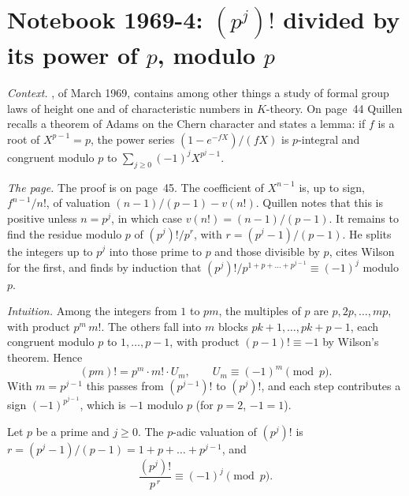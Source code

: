 \section[Notebook 1969-4: $(p^j)!$ divided by its power of $p$]{Notebook 1969-4: $(p^j)!$ divided by its power of $p$, modulo $p$\protect{}}\label{sec:quillen-1969-4}

\emph{Context.} , of March 1969, contains among other things a study of formal group laws of height one and of characteristic numbers in $K$-theory. On page~44 Quillen recalls a theorem of Adams on the Chern character and states a lemma: if $f$ is a root of $X^{p-1} = p$, the power series $(1 - e^{-fX})/(fX)$ is $p$-integral and congruent modulo $p$ to $\sum_{j \ge 0} (-1)^j X^{p^j - 1}$.

\emph{The page.} The proof is on page~45. The coefficient of $X^{n-1}$ is, up to sign, $f^{n-1}/n!$, of valuation $(n-1)/(p-1) - v(n!)$. Quillen notes that this is positive unless $n = p^j$, in which case $v(n!) = (n-1)/(p-1)$. It remains to find the residue modulo $p$ of $(p^j)!/p^r$, with $r = (p^j - 1)/(p - 1)$. He splits the integers up to $p^j$ into those prime to $p$ and those divisible by $p$, cites Wilson for the first, and finds by induction that $(p^j)!/p^{1 + p + \dots + p^{j-1}} \equiv (-1)^j$ modulo $p$.

\emph{Intuition.} Among the integers from $1$ to $pm$, the multiples of $p$ are $p, 2p, \dots, mp$, with product $p^m\,m!$. The others fall into $m$ blocks $pk + 1, \dots, pk + p - 1$, each congruent modulo $p$ to $1, \dots, p - 1$, with product $(p-1)! \equiv -1$ by Wilson's theorem. Hence
\[
  (pm)! = p^m \cdot m! \cdot U_m, \qquad U_m \equiv (-1)^m \pmod p.
\]
With $m = p^{j-1}$ this passes from $(p^{j-1})!$ to $(p^j)!$, and each step contributes a sign $(-1)^{p^{j-1}}$, which is $-1$ modulo $p$ (for $p = 2$, $-1 = 1$).

\begin{encadre}
\begin{theoreme}\label{thm:quillen-1969-4}
Let $p$ be a prime and $j \ge 0$. The $p$-adic valuation of $(p^j)!$ is $r = (p^j - 1)/(p - 1) = 1 + p + \dots + p^{j-1}$, and
\[
  \frac{(p^j)!}{p^{\,r}} \equiv (-1)^j \pmod p.
\]
\end{theoreme}
\end{encadre}


